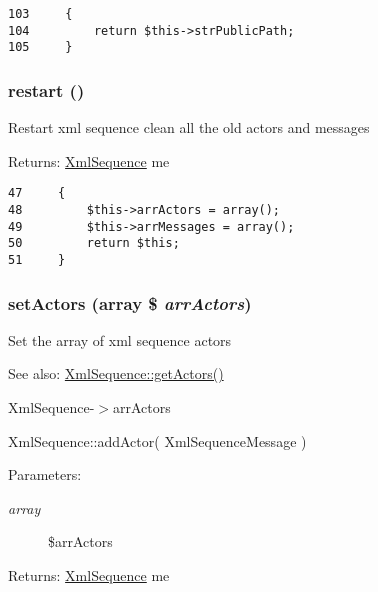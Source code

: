 \begin{Code}\begin{verbatim}103     {
104         return $this->strPublicPath;
105     }
\end{verbatim}
\end{Code}


\hypertarget{class_xml_sequence_c8de9e38ce27c87f710dff42a13455cf}{
\subsubsection[{restart}]{\setlength{\rightskip}{0pt plus 5cm}restart ()}}
\label{class_xml_sequence_c8de9e38ce27c87f710dff42a13455cf}


Restart xml sequence clean all the old actors and messages

\begin{Desc}
\item[Returns:]\hyperlink{class_xml_sequence}{XmlSequence} me \end{Desc}


\begin{Code}\begin{verbatim}47     {
48         $this->arrActors = array();
49         $this->arrMessages = array();
50         return $this;
51     }
\end{verbatim}
\end{Code}


\hypertarget{class_xml_sequence_3ffb44470b89a8f309c8e18159bdac24}{
\subsubsection[{setActors}]{\setlength{\rightskip}{0pt plus 5cm}setActors (array \$ {\em arrActors})}}
\label{class_xml_sequence_3ffb44470b89a8f309c8e18159bdac24}


Set the array of xml sequence actors

\begin{Desc}
\item[See also:]\hyperlink{class_xml_sequence_c5620e43921e5f05c953d7afd78b6bcd}{XmlSequence::getActors()} 

XmlSequence-$>$arrActors 

XmlSequence::addActor( XmlSequenceMessage ) \end{Desc}
\begin{Desc}
\item[Parameters:]
\begin{description}
\item[{\em array}]\$arrActors \end{description}
\end{Desc}
\begin{Desc}
\item[Returns:]\hyperlink{class_xml_sequence}{XmlSequence} me \end{Desc}


